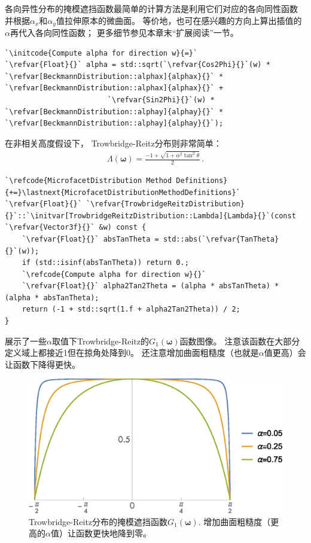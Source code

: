 各向异性分布的掩模遮挡函数最简单的计算方法是利用它们对应的各向同性函数
并根据$\alpha_x$和$\alpha_y$值拉伸原本的微曲面。
等价地，也可在感兴趣的方向上算出插值的$\alpha$再代入各向同性函数；
更多细节参见本章末“扩展阅读”一节。
\begin{lstlisting}
`\initcode{Compute alpha for direction w}{=}`
`\refvar{Float}{}` alpha = std::sqrt(`\refvar{Cos2Phi}{}`(w) * `\refvar[BeckmannDistribution::alphax]{alphax}{}` * `\refvar[BeckmannDistribution::alphax]{alphax}{}` +
                        `\refvar{Sin2Phi}{}`(w) * `\refvar[BeckmannDistribution::alphay]{alphay}{}` * `\refvar[BeckmannDistribution::alphay]{alphay}{}`);
\end{lstlisting}

在非相关高度假设下，
Trowbridge-Reitz分布则非常简单：
\begin{align*}
    \Lambda({\bm\omega})=\frac{-1+\sqrt{1+\alpha^2\tan^2\theta}}{2}\, .
\end{align*}
\begin{lstlisting}
`\refcode{MicrofacetDistribution Method Definitions}{+=}\lastnext{MicrofacetDistributionMethodDefinitions}`
`\refvar{Float}{}` `\refvar{TrowbridgeReitzDistribution}{}`::`\initvar[TrowbridgeReitzDistribution::Lambda]{Lambda}{}`(const `\refvar{Vector3f}{}` &w) const {
    `\refvar{Float}{}` absTanTheta = std::abs(`\refvar{TanTheta}{}`(w));
    if (std::isinf(absTanTheta)) return 0.;
    `\refcode{Compute alpha for direction w}{}`
    `\refvar{Float}{}` alpha2Tan2Theta = (alpha * absTanTheta) * (alpha * absTanTheta);
    return (-1 + std::sqrt(1.f + alpha2Tan2Theta)) / 2;
}
\end{lstlisting}

展示了一些$\alpha$取值下Trowbridge-Reitz的$G_1({\bm\omega})$函数图像。
注意该函数在大部分定义域上都接近1但在掠角处降到0。
还注意增加曲面粗糙度（也就是$\alpha$值更高）会让函数下降得更快。
\begin{figure}[htbp]
    \centering
    \includegraphics[width=0.75\linewidth]{Pictures/chap08/tr-g1-vs-alpha.eps}
    \caption{Trowbridge-Reitz分布的掩模遮挡函数$G_1({\bm\omega})$.
    增加曲面粗糙度（更高的$\alpha$值）让函数更快地降到零。}
    \label{fig:8.18}
\end{figure}

